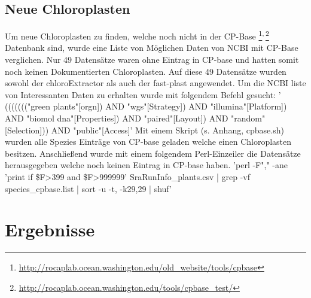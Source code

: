\documentclass{scrartcl}
\begin{document}
\subsection{Neue Chloroplasten}
\label{sec-2-6}
Um neue Chloroplasten zu finden, welche noch nicht in der CP-Base \footnote{\url{http://rocaplab.ocean.washington.edu/old_website/tools/cpbase}}\textsuperscript{,}\,\footnote{\url{http://rocaplab.ocean.washington.edu/tools/cpbase_test/}} Datenbank sind, wurde eine Liste von Möglichen Daten von NCBI mit CP-Base verglichen. Nur 49 Datensätze waren ohne 
Eintrag in CP-base und hatten somit noch keinen Dokumentierten Chloroplasten. Auf diese 49 Datensätze wurden sowohl der chloroExtractor als auch der fast-plast angewendet. 
Um die NCBI liste von Interessanten Daten zu erhalten wurde mit folgendem Befehl gesucht: 
' ((((((("green plants"[orgn]) AND "wgs"[Strategy]) AND "illumina"[Platform]) AND "biomol dna"[Properties]) AND "paired"[Layout]) AND "random"[Selection])) AND "public"[Access]'
Mit einem Skript (s. Anhang, cpbase.sh) wurden alle Spezies Einträge von CP-base geladen welche einen Chloroplasten besitzen. Anschließend wurde mit einem folgendem Perl-Einzeiler
die Datensätze herausgegeben welche noch keinen Eintrag in CP-base haben.
'perl -F"," -ane 'print if \$F\footnotemark[35]{}>399 and \$F\footnotemark[3]{}>999999' SraRunInfo\_plants.csv | grep -vf species\_cpbase.list | sort -u -t, -k29,29 | shuf'


\section{Ergebnisse}
\label{sec-3}
\end{document}
